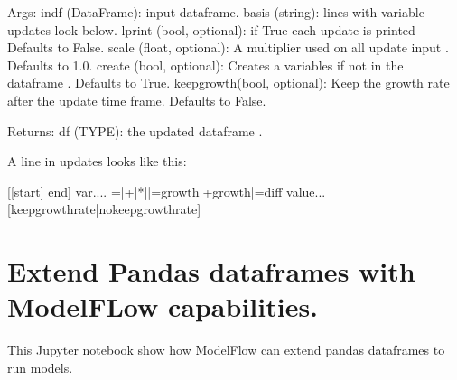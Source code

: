 \documentclass[letterpaper,10pt,english]{jupyterBook}
\begin{document}
\begin{sphinxVerbatim}[commandchars=\\\{\}]
Args:
        indf (DataFrame): input dataframe.
        basis (string): lines with variable updates look below.
        lprint (bool, optional): if True each update is printed  Defaults to False.
        scale (float, optional): A multiplier used on all update input . Defaults to 1.0.
        create (bool, optional): Creates a variables if not in the dataframe . Defaults to True.
        keep\PYGZus{}growth(bool, optional): Keep the growth rate after the update time frame. Defaults to False.

    Returns:
        df (TYPE): the updated dataframe .
        
    A line in updates looks like this:     
           
    \PYGZdq{}\PYGZlt{}\PYGZdq{}[[start] end]\PYGZdq{}\PYGZgt{}\PYGZdq{} \PYGZlt{}var....\PYGZgt{} \PYGZlt{}=|+|*|\PYGZpc{}|=growth|+growth|=diff\PYGZgt{} \PYGZlt{}value\PYGZgt{}...  [\PYGZhy{}\PYGZhy{}keep\PYGZus{}growth\PYGZus{}rate|\PYGZhy{}\PYGZhy{}no\PYGZus{}keep\PYGZus{}growth\PYGZus{}rate]
\end{sphinxVerbatim}

\sphinxstepscope


\chapter{Extend Pandas dataframes with ModelFLow capabilities.}
\label{\detokenize{content/howto/update/extending_dataframes:extend-pandas-dataframes-with-modelflow-capabilities}}\label{\detokenize{content/howto/update/extending_dataframes::doc}}
\sphinxAtStartPar
This Jupyter notebook show how ModelFlow can extend pandas dataframes to run models.
\end{document}

